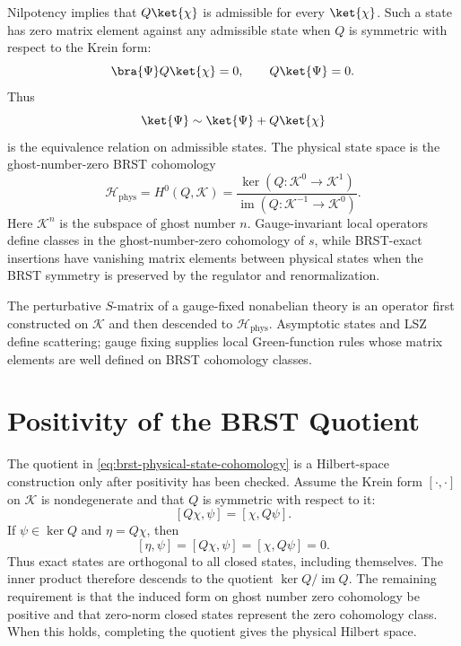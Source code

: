 Nilpotency implies that \(Q\ket{\chi}\) is admissible for every
\(\ket{\chi}\).  Such a state has zero matrix element against any admissible
state when \(Q\) is symmetric with respect to the Krein form:
\[
  \bra{\Psi}Q\ket{\chi}=0,
  \qquad
  Q\ket{\Psi}=0 .
\]
Thus
\[
  \ket{\Psi}\sim \ket{\Psi}+Q\ket{\chi}
\]
is the equivalence relation on admissible states.  The physical state space is
the ghost-number-zero BRST cohomology
\begin{equation}
  \mathcal H_{\mathrm{phys}}
  =
  H^0(Q,\mathcal K)
  =
  \frac{\ker(Q:\mathcal K^0\to\mathcal K^1)}
       {\operatorname{im}(Q:\mathcal K^{-1}\to\mathcal K^0)} .
  \label{eq:brst-physical-state-cohomology}
\end{equation}
Here \(\mathcal K^n\) is the subspace of ghost number \(n\).  Gauge-invariant
local operators define classes in the ghost-number-zero cohomology of \(s\),
while BRST-exact insertions have vanishing matrix elements between physical
states when the BRST symmetry is preserved by the regulator and
renormalization.

The perturbative \(S\)-matrix of a gauge-fixed nonabelian theory is an operator
first constructed on \(\mathcal K\) and then descended to
\(\mathcal H_{\mathrm{phys}}\).  Asymptotic states and LSZ define scattering;
gauge fixing supplies local Green-function rules whose matrix elements are
well defined on BRST cohomology classes.

\section{Positivity of the BRST Quotient}

The quotient in \eqref{eq:brst-physical-state-cohomology} is a Hilbert-space
construction only after positivity has been checked.  Assume the Krein form
\([\cdot,\cdot]\) on \(\mathcal K\) is nondegenerate and that \(Q\) is
symmetric with respect to it:
\[
  [Q\chi,\psi]=[\chi,Q\psi] .
\]
If \(\psi\in\ker Q\) and \(\eta=Q\chi\), then
\[
  [\eta,\psi]
  =
  [Q\chi,\psi]
  =
  [\chi,Q\psi]
  =
  0.
\]
Thus exact states are orthogonal to all closed states, including themselves.
The inner product therefore descends to the quotient
\(\ker Q/\operatorname{im}Q\).  The remaining requirement is that the induced
form on ghost number zero cohomology be positive and that zero-norm closed
states represent the zero cohomology class.  When this holds, completing the
quotient gives the physical Hilbert space.

